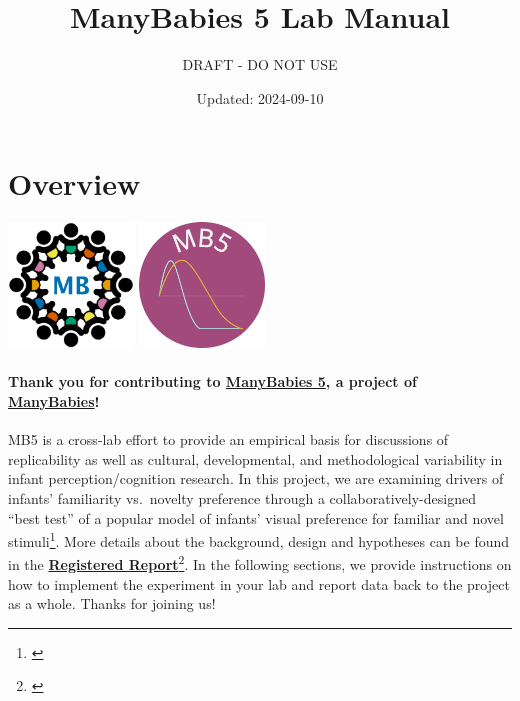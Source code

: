 \documentclass[
]{book}
\title{ManyBabies 5 Lab Manual}
\subtitle{DRAFT - DO NOT USE}
\author{}
\date{\vspace{-2.5em}Updated: 2024-09-10}
\begin{document}
\maketitle

{
\setcounter{tocdepth}{1}
\tableofcontents
}
\chapter*{Overview}\label{overview}

\includegraphics[width=0.25\textwidth,height=\textheight]{images/mb-logo.png} \includegraphics[width=0.25\textwidth,height=\textheight]{images/mb5-logo.png}

\subsubsection*{\texorpdfstring{Thank you for contributing to \href{https://manybabies.org/MB5/}{\textbf{ManyBabies 5}}, a project of \href{https://manybabies.org/}{\textbf{ManyBabies}}!}{Thank you for contributing to ManyBabies 5, a project of ManyBabies!}}\label{thank-you-for-contributing-to-manybabies-5-a-project-of-manybabies}

MB5 is a cross-lab effort to provide an empirical basis for discussions of replicability as well as cultural, developmental, and methodological variability in infant perception/cognition research. In this project, we are examining drivers of infants' familiarity vs.~novelty preference through a collaboratively-designed ``best test'' of a popular model of infants' visual preference for familiar and novel stimuli\footnote{\citet{hunterames}}. More details about the background, design and hypotheses can be found in the \href{https://osf.io/preprints/psyarxiv/ck3vd}{\textbf{Registered Report}}\footnote{\citet{kosiezettersten2024}}. In the following sections, we provide instructions on how to implement the experiment in your lab and report data back to the project as a whole. Thanks for joining us!
\end{document}
